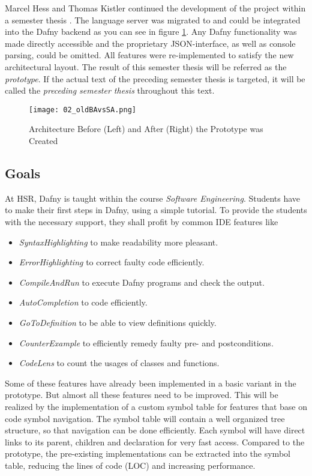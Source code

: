Marcel Hess and Thomas Kistler continued the development of the project within a semester thesis \cite{sa}.
The language server was migrated to \CsharpWithSpace and could be integrated into the Dafny backend
as you can see in figure \ref{fig:oldBAvsSA_2}.
Any Dafny functionality was made directly accessible and the proprietary JSON-interface, as well as console parsing, could be omitted.
All features were re-implemented to satisfy the new architectural layout.
The result of this semester thesis will be referred as the \textit{prototype}. 
If the actual text of the preceding semester thesis is targeted, it will be called the \textit{preceding semester thesis} throughout this text. 

\begin{figure}[ht]
    \centering
    \texttt{[image: 02\_oldBAvsSA.png]}
    \caption{Architecture Before (Left) and After (Right) the Prototype was Created}
    \label{fig:oldBAvsSA_2}
\end{figure}


\subsection{Goals}
At HSR, Dafny is taught within the course \textit{Software Engineering}.
Students have to make their first steps in Dafny, using a simple tutorial.
To provide the students with the necessary support, they shall profit by common IDE features like
\begin{itemize}
    \item \textit{SyntaxHighlighting} to make readability more pleasant.
    \item \textit{ErrorHighlighting} to correct faulty code efficiently.
    \item \textit{CompileAndRun} to execute Dafny programs and check the output.
    \item \textit{AutoCompletion} to code efficiently.
    \item \textit{GoToDefinition} to be able to view definitions quickly.
    \item \textit{CounterExample} to efficiently remedy faulty pre- and postconditions.
    \item \textit{CodeLens} to count the usages of classes and functions.
\end{itemize}

Some of these features have already been implemented in a basic variant in the prototype.
But almost all these features need to be improved.
This will be realized by the implementation of a custom symbol table for features that base on code symbol navigation.
The symbol table will contain a well organized tree structure, so that navigation can be done efficiently.
Each symbol will have direct links to its parent, children and declaration for very fast access.
Compared to the prototype, the pre-existing implementations can be extracted into the symbol table,
reducing the lines of code (LOC) and increasing performance.  \\

